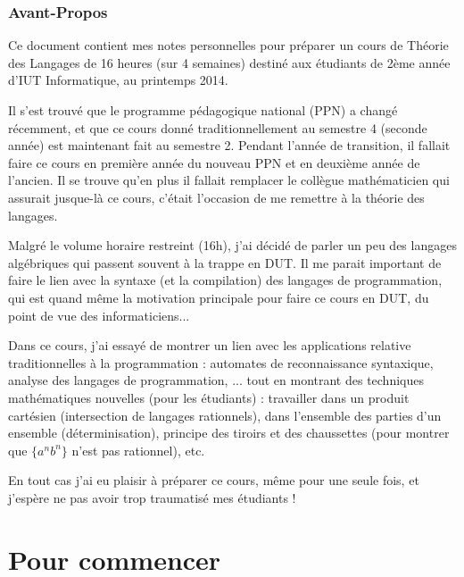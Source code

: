 \documentclass[10pt,twoside]{article}
\begin{document}


\maketitle

\newpage

\section*{Avant-Propos}

Ce document contient mes notes personnelles pour préparer un cours de
Théorie des Langages de 16 heures (sur 4 semaines) 
destiné aux étudiants de 2ème année d'IUT
Informatique, au printemps 2014.

Il s'est trouvé que le programme pédagogique national (PPN) a changé
récemment, et que ce cours donné traditionnellement au semestre 4
(seconde année) est maintenant fait au semestre 2. Pendant l'année de
transition, il fallait faire ce cours en première année du nouveau PPN
et en deuxième année de l'ancien. Il se trouve qu'en plus il fallait
remplacer le collègue mathématicien qui assurait jusque-là ce cours,
c'était l'occasion de me remettre à la théorie des langages.

Malgré le volume horaire restreint (16h), j'ai décidé de parler un peu des
langages algébriques qui passent souvent à la trappe en DUT. Il me
parait important de faire le lien avec la syntaxe (et la compilation)
des langages de programmation, qui est quand même la motivation
principale pour faire ce cours en DUT, du point de vue des
informaticiens...


Dans ce cours, j'ai essayé de montrer un lien avec les applications
relative traditionnelles à la programmation : automates de reconnaissance
syntaxique, analyse des langages de programmation, ... tout en
montrant des techniques mathématiques nouvelles (pour les étudiants) :
travailler dans un produit cartésien (intersection de langages
rationnels), dans l'ensemble des parties d'un ensemble
(déterminisation), principe des tiroirs et des chaussettes (pour montrer
que $\{a^n b^n\}$ n'est pas rationnel), etc.

En tout cas j'ai eu plaisir à préparer ce cours, même pour une seule
fois, et j'espère ne pas avoir trop traumatisé mes étudiants !

\newpage



\tableofcontents
\clearpage

\part{Pour commencer}
\end{document}
